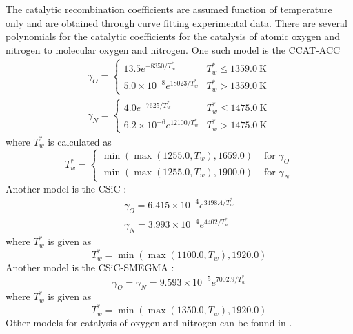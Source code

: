 \documentclass{warpdoc}
\begin{document}
The catalytic recombination coefficients are assumed function of temperature only and are obtained through curve fitting experimental data.  There are several polynomials for the catalytic coefficients for
the catalysis of atomic oxygen and nitrogen to molecular oxygen and nitrogen. One such model is the CCAT-ACC \cite{nasa:1997:stewart}
%
\begin{equation}
\begin{array}{ll}
\gamma_{O}=\left\{\begin{array}{ll}
13.5 e^{-8350 / T_{w}^{*}} & T_{w}^{*} \leq 1359.0 \mathrm{~K} \\
5.0 \times 10^{-8} e^{18023 / T_{w}^{*}} & T_{w}^{*}>1359.0 \mathrm{~K}
\end{array}\right. \\
\gamma_{N}=\left\{\begin{array}{ll}
4.0 e^{-7625 / T_{w}^{*}} & T_{w}^{*} \leq 1475.0 \mathrm{~K} \\
6.2 \times 10^{-6} e^{12100 / T_{w}^{*}} & T_{w}^{*}>1475.0 \mathrm{~K}
\end{array}\right.
\end{array}
\end{equation}
%
where $T_{w}^{*}$ is calculated as
%
\begin{equation}
T_{w}^{*}=\left\{\begin{array}{ll}
\min \left(\max \left(1255.0, T_{w}\right), 1659.0\right) & \text { for } \gamma_{O} \\
\min \left(\max \left(1255.0, T_{w}\right), 1900.0\right) & \text { for } \gamma_{N}
\end{array}\right.
\end{equation}
%
Another model is the CSiC \cite{nasa:1997:stewart}:
%
\begin{equation}
\begin{array}{l}
\gamma_{O}=6.415 \times 10^{-4} e^{3498.4 / T_{w}^{*}} \\
\gamma_{N}=3.993 \times 10^{-4} e^{4402 / T_{w}^{*}}
\end{array}
\end{equation}
%
where $T_{w}^{*}$ is given as
%
\begin{equation}
T_{w}^{*}=\min \left(\max \left(1100.0, T_{w}\right), 1920.0\right)
\end{equation}
%
Another model is the CSiC-SMEGMA \cite{nasa:1997:stewart}:
%
\begin{equation}
\gamma_{O}=\gamma_{N}=9.593 \times 10^{-5} e^{7002.9 / T_{w}^{*}}
\end{equation}
%
where $T_{w}^{*}$ is given as
%
\begin{equation}
T_{w}^{*}=\min \left(\max \left(1350.0, T_{w}\right), 1920.0\right)
\end{equation}
%
Other models for catalysis of oxygen and nitrogen can be found in \cite{nasa:2020:thompson}.
\end{document}
